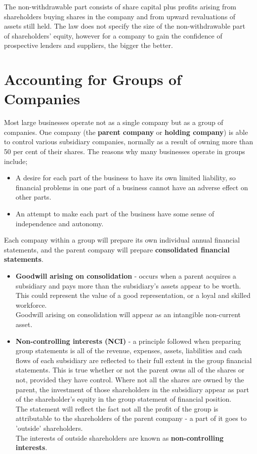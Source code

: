 \documentclass{report}
\begin{document}
The non-withdrawable part consists of share capital plus profits arising from shareholders buying shares in the company and from upward revaluations of assets still held. The law does not specify the size of the non-withdrawable part of shareholders' equity, however for a company to gain the confidence of prospective lenders and suppliers, the bigger the better.

\section{Accounting for Groups of Companies}

Most large businesses operate not as a single company but as a group of companies. One company (the \textbf{parent company} or \textbf{holding company}) is able to control various subsidiary companies, normally as a result of owning more than 50 per cent of their shares. The reasons why many businesses operate in groups include;
\begin{itemize}
    \item A desire for each part of the business to have its own limited liability, so financial problems in one part of a business cannot have an adverse effect on other parts.
    \item An attempt to make each part of the business have some sense of independence and autonomy.\\
\end{itemize}

Each company within a group will prepare its own individual annual financial statements, and the parent company will prepare \textbf{consolidated financial statements}.

\begin{itemize}
    \item \textbf{Goodwill arising on consolidation} - occurs when a parent acquires a subsidiary and pays more than the subsidiary's assets appear to be worth.\\
    This could represent the value of a good representation, or a loyal and skilled workforce.\\
    Goodwill arising on consolidation will appear as an intangible non-current asset.
    \item \textbf{Non-controlling interests (NCI)} - a principle followed when preparing group statements is all of the revenue, expenses, assets, liabilities and cash flows of each subsidiary are reflected to their full extent in the group financial statements. This is true whether or not the parent owns all of the shares or not, provided they have control. Where not all the shares are owned by the parent, the investment of those shareholders in the subsidiary appear as part of the shareholder's equity in the group statement of financial position.\\
    The statement will reflect the fact not all the profit of the group is attributable to the shareholders of the parent company - a part of it goes to 'outside' shareholders.\\
    The interests of outside shareholders are known as \textbf{non-controlling interests}.
\end{itemize}
\end{document}
